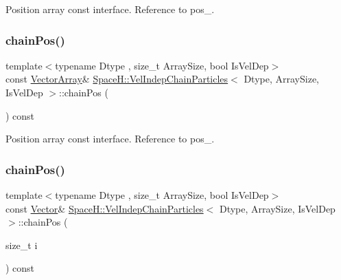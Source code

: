 Position array const interface. Reference to pos\+\_\+. 

\mbox{\label{class_space_h_1_1_vel_indep_chain_particles_a2dd7d2f703141d0ef3d8728b2a57cb83}} 
\subsubsection{\texorpdfstring{chain\+Pos()}{chainPos()}\hspace{0.1cm}{\footnotesize\ttfamily [2/4]}}
{\footnotesize\ttfamily template$<$typename Dtype , size\+\_\+t Array\+Size, bool Is\+Vel\+Dep$>$ \\
const \mbox{\hyperlink{class_space_h_1_1_vel_indep_particles_aa9983058940249df8b00fa800e8cbad2}{Vector\+Array}}\& \mbox{\hyperlink{class_space_h_1_1_vel_indep_chain_particles}{Space\+H\+::\+Vel\+Indep\+Chain\+Particles}}$<$ Dtype, Array\+Size, Is\+Vel\+Dep $>$\+::chain\+Pos (\begin{DoxyParamCaption}{ }\end{DoxyParamCaption}) const\hspace{0.3cm}{\ttfamily [inline]}}



Position array const interface. Reference to pos\+\_\+. 

\mbox{\label{class_space_h_1_1_vel_indep_chain_particles_a1d1f6b6ed5e916f84e6502d98773ed13}} 
\subsubsection{\texorpdfstring{chain\+Pos()}{chainPos()}\hspace{0.1cm}{\footnotesize\ttfamily [3/4]}}
{\footnotesize\ttfamily template$<$typename Dtype , size\+\_\+t Array\+Size, bool Is\+Vel\+Dep$>$ \\
const \mbox{\hyperlink{class_space_h_1_1_vel_indep_particles_a61bbcfdb0dc7f99f3c68af69a755c935}{Vector}}\& \mbox{\hyperlink{class_space_h_1_1_vel_indep_chain_particles}{Space\+H\+::\+Vel\+Indep\+Chain\+Particles}}$<$ Dtype, Array\+Size, Is\+Vel\+Dep $>$\+::chain\+Pos (\begin{DoxyParamCaption}\item[{size\+\_\+t}]{i }\end{DoxyParamCaption}) const\hspace{0.3cm}{\ttfamily [inline]}}



